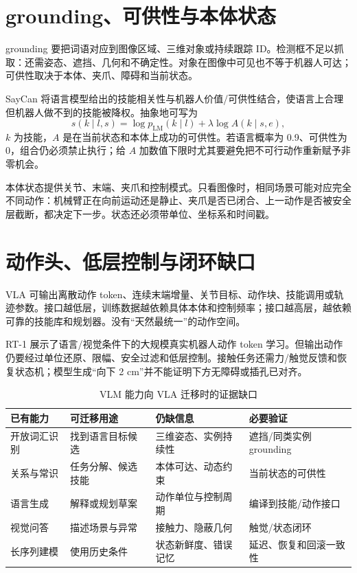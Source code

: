 \section{grounding、可供性与本体状态}

grounding 要把词语对应到图像区域、三维对象或持续跟踪 ID。检测框不足以抓取：还需姿态、遮挡、几何和不确定性。对象在图像中可见也不等于机器人可达；可供性取决于本体、夹爪、障碍和当前状态。

SayCan 将语言模型给出的技能相关性与机器人价值/可供性结合，使语言上合理但机器人做不到的技能被降权\cite{ahn2022saycan}。抽象地可写为
\begin{equation}
s(k\mid l,s)=\log p_{\mathrm{LM}}(k\mid l)
+\lambda\log A(k\mid s,e),
\label{eq:language-affordance-score}
\end{equation}
$k$ 为技能，$A$ 是在当前状态和本体上成功的可供性。若语言概率为 0.9、可供性为 0，组合仍必须禁止执行；给 $A$ 加数值下限时尤其要避免把不可行动作重新赋予非零机会。

本体状态提供关节、末端、夹爪和控制模式。只看图像时，相同场景可能对应完全不同动作：机械臂正在向前运动还是静止、夹爪是否已闭合、上一动作是否被安全层截断，都决定下一步。状态还必须带单位、坐标系和时间戳。

\section{动作头、低层控制与闭环缺口}

VLA 可输出离散动作 token、连续末端增量、关节目标、动作块、技能调用或轨迹参数。接口越低层，训练数据越依赖具体本体和控制频率；接口越高层，越依赖可靠的技能库和规划器。没有“天然最统一”的动作空间。

RT-1 展示了语言/视觉条件下的大规模真实机器人动作 token 学习\cite{brohan2022rt1}。但输出动作仍要经过单位还原、限幅、安全过滤和低层控制。接触任务还需力/触觉反馈和恢复状态机；模型生成“向下 2 cm”并不能证明下方无障碍或插孔已对齐。

\begin{table}[H]
\centering
\caption{VLM 能力向 VLA 迁移时的证据缺口}
\label{tab:vlm-vla-transfer-gap}
\begin{tabularx}{\textwidth}{>{\raggedright\arraybackslash}p{}YY>{\raggedright\arraybackslash}p{0.28\textwidth}}
\toprule
已有能力 & 可迁移用途 & 仍缺信息 & 必要验证 \\
\midrule
开放词汇识别 & 找到语言目标候选 & 三维姿态、实例持续性 & 遮挡/同类实例 grounding \\
关系与常识 & 任务分解、候选技能 & 本体可达、动态约束 & 当前状态的可供性 \\
语言生成 & 解释或规划草案 & 动作单位与控制周期 & 编译到技能/动作接口 \\
视觉问答 & 描述场景与异常 & 接触力、隐蔽几何 & 触觉/状态闭环 \\
长序列建模 & 使用历史条件 & 状态新鲜度、错误记忆 & 延迟、恢复和回滚一致性 \\
\bottomrule
\end{tabularx}
\end{table}

